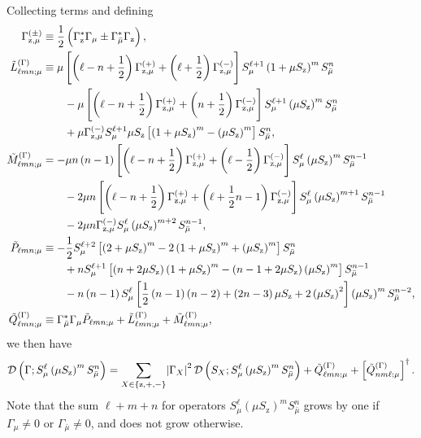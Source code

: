\documentclass[pra,reprint,longbibliography]{revtex4-1}
\newcommand{\f}[2]{\dfrac{#1}{#2}} %
\newcommand{\p}[1]{\left(#1\right)} %
\renewcommand{\sp}[1]{\left[#1\right]} %
\renewcommand{\set}[1]{\left\{#1\right\}} %
\newcommand{\D}{\mathcal{D}}
\newcommand{\z}{\text{z}}
\newcommand{\bmu}{{\bar\mu}}
\newcommand{\1}{\mathds{1}}
\begin{document}
Collecting terms and defining
\begin{align}
  \Gamma_{\z,\mu}^{(\pm)}
  &\equiv \f12\p{\Gamma_\z^* \Gamma_\mu \pm \Gamma_\bmu^* \Gamma_\z},
  \allowdisplaybreaks \\
  \tilde L_{\ell mn;\mu}^{(\Gamma)}
  &\equiv \mu \sp{\p{\ell-n+\f12} \Gamma_{\z,\mu}^{(+)}
    + \p{\ell+\f12} \Gamma_{\z,\mu}^{(-)}}
  S_\mu^{\ell+1} \p{1+\mu S_\z}^m S_\bmu^n \notag \\
  &\qquad -\mu \sp{\p{\ell-n+\f12} \Gamma_{\z,\mu}^{(+)}
    + \p{n+\f12} \Gamma_{\z,\mu}^{(-)}}
  S_\mu^{\ell+1} \p{\mu S_\z}^m S_\bmu^n \notag \\
  &\qquad + \mu \Gamma_{\z,\mu}^{(-)}
  S_\mu^{\ell+1} \mu S_\z
  \sp{\p{1+\mu S_\z}^m - \p{\mu S_\z}^m} S_\bmu^n,
  \allowdisplaybreaks \\
  \tilde M_{\ell mn;\mu}^{(\Gamma)}
  &= -\mu n\p{n-1} \sp{\p{\ell-n+\f12} \Gamma_{\z,\mu}^{(+)}
    + \p{\ell-\f12} \Gamma_{\z,\mu}^{(-)}}
  S_\mu^\ell \p{\mu S_\z}^m S_\bmu^{n-1} \notag \\
  &\qquad - 2\mu n \sp{\p{\ell-n+\f12} \Gamma_{\z,\mu}^{(+)}
    + \p{\ell+\f12n-1} \Gamma_{\z,\mu}^{(-)}}
  S_\mu^\ell \p{\mu S_\z}^{m+1} S_\bmu^{n-1} \notag \\
  &\qquad - 2\mu n \Gamma_{\z,\mu}^{(-)}
  S_\mu^\ell \p{\mu S_\z}^{m+2} S_\bmu^{n-1},
  \allowdisplaybreaks \\
  \tilde P_{\ell mn;\mu}
  &\equiv -\f12 S_\mu^{\ell+2}
  \sp{\p{2+\mu S_\z}^m - 2\p{1+\mu S_\z}^m + \p{\mu S_\z}^m}
  S_\bmu^n \notag \\
  &\qquad + n S_\mu^{\ell+1} \sp{\p{n+2\mu S_\z} \p{1+\mu S_\z}^m
    - \p{n-1+2\mu S_\z} \p{\mu S_\z}^m}
  S_\bmu^{n-1} \notag \\
  &\qquad -n\p{n-1} S_\mu^\ell
  \sp{\f12\p{n-1}\p{n-2} + \p{2n-3}\mu S_\z + 2\p{\mu S_\z}^2}
  \p{\mu S_\z}^m S_\bmu^{n-2},
  \allowdisplaybreaks \\
  \tilde Q_{\ell mn;\mu}^{(\Gamma)}
  &\equiv \Gamma_\bmu^* \Gamma_\mu \tilde P_{\ell mn;\mu}
  + \tilde L_{\ell mn;\mu}^{(\Gamma)}
  + \tilde M_{\ell mn;\mu}^{(\Gamma)},
\end{align}
we then have
\begin{align}
  \D\p{\Gamma; S_\mu^\ell \p{\mu S_\z}^m S_\bmu^n}
  = \sum_{X\in\set{\z,+,-}} \abs{\Gamma_X}^2
  \D\p{S_X; S_\mu^\ell \p{\mu S_\z}^m S_\bmu^n}
  + \tilde Q_{\ell mn;\mu}^{(\Gamma)}
  + \sp{\tilde Q_{nm\ell;\mu}^{(\Gamma)}}^\dag.
\end{align}
Note that the sum $\ell+m+n$ for operators
$S_\mu^\ell \p{\mu S_\z}^m S_\bmu^n$ grows by one if $\Gamma_\mu\ne0$
or $\Gamma_\bmu\ne0$, and does not grow otherwise.
\end{document}
